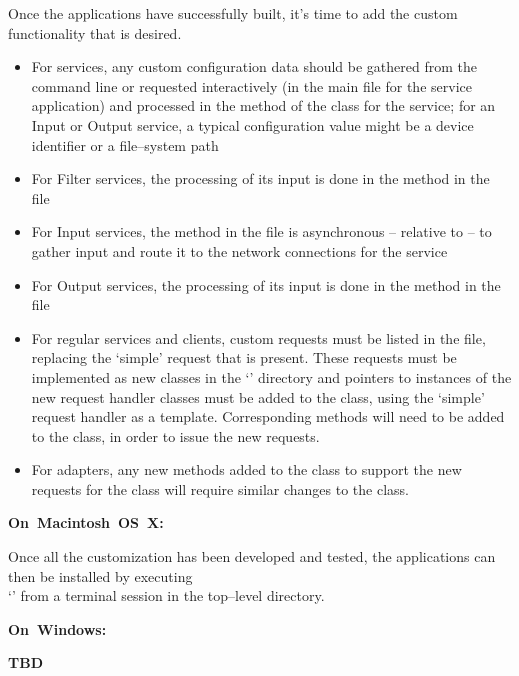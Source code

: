 \tertiaryEnd{}
Once the applications have successfully built, it's time to add the custom functionality
that is desired.
\begin{itemize}
\item For  services, any custom configuration data should be gathered from
the command line or requested interactively (in the main file for the service
application) and processed in the  method of the class for the service;
for an Input or Output service, a typical configuration value might be a device
identifier or a file--system path
\item For Filter services, the processing of its input is done in the 
method in the\\
 file
\item For Input services, the  method in the 
file is asynchronous -- relative to \mplusm{} -- to gather input and route it to the
\yarp{} network connections for the service
\item For Output services, the processing of its input is done in the 
method in the\\
 file
\item For regular services and clients, custom requests must be listed in the
 file, replacing the `simple' request that is present.
These requests must be implemented as new classes in the `' directory
and pointers to instances of the new request handler classes must be added to the
 class, using the `simple' request handler as a template.
Corresponding methods will need to be added to the  class, in order to
issue the new requests.
\item For adapters, any new methods added to the  class to support the
new requests for the  class will require similar changes to the
 class.
\end{itemize}
\tertiaryEnd{}
\begin{center}\textbf{On~Macintosh~OS~X:}\end{center}
Once all the customization has been developed and tested, the applications can then be
installed by executing\\
`' from a terminal session in the top--level directory.
\begin{center}\textbf{On~Windows:}\end{center}
\textbf{TBD}
\tertiaryEnd{}
\secondaryEnd{}
\appendixEnd{}
